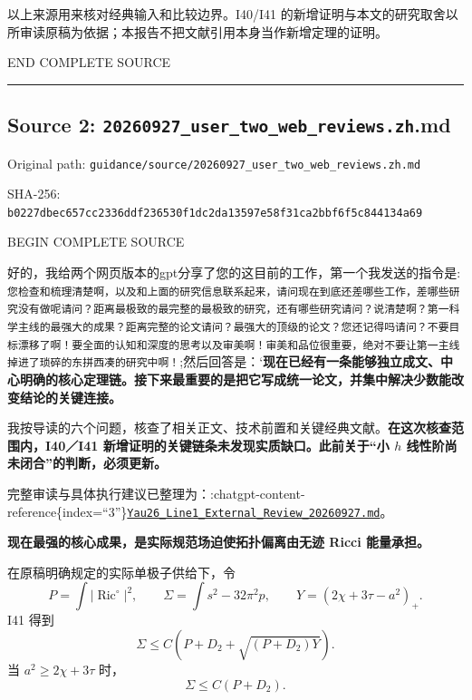 \documentclass[
  10pt,
]{article}
\begin{document}
以上来源用来核对经典输入和比较边界。I40/I41
的新增证明与本文的研究取舍以所审读原稿为依据；本报告不把文献引用本身当作新增定理的证明。

END COMPLETE SOURCE

\begin{center}\rule{0.5\linewidth}{0.5pt}\end{center}

\hypertarget{source-2-20260927_user_two_web_reviews.zh.md}{%
\subsection{Source 2:
\nolinkurl{20260927_user_two_web_reviews.zh}.md}\label{source-2-20260927_user_two_web_reviews.zh.md}}

Original path:
\nolinkurl{guidance/source/20260927_user_two_web_reviews.zh.md}

SHA-256:
\nolinkurl{b0227dbec657cc2336ddf236530f1dc2da13597e58f31ca2bbf6f5c844134a69}

BEGIN COMPLETE SOURCE

好的，我给两个网页版本的gpt分享了您的这目前的工作，第一个我发送的指令是:\texttt{您检查和梳理清楚啊，以及和上面的研究信息联系起来，请问现在到底还差哪些工作，差哪些研究没有做呢请问？距离最极致的最完整的最极致的研究，还有哪些研究请问？说清楚啊？第一科学主线的最强大的成果？距离完整的论文请问？最强大的顶级的论文？您还记得吗请问？不要目标漂移了啊！要全面的认知和深度的思考以及审美啊！审美和品位很重要，绝对不要让第一主线掉进了琐碎的东拼西凑的研究中啊！};然后回答是：`\textbf{现在已经有一条能够独立成文、中心明确的核心定理链。接下来最重要的是把它写成统一论文，并集中解决少数能改变结论的关键连接。}

我按导读的六个问题，核查了相关正文、技术前置和关键经典文献。\textbf{在这次核查范围内，I40／I41
新增证明的关键链条未发现实质缺口。此前关于``小 \(h\)
线性阶尚未闭合''的判断，必须更新。}

完整审读与具体执行建议已整理为：:chatgpt-content-reference\{index=``3''\}\href{sandbox:/workspace/scratch/e82e2d951212/Yau26_Line1_External_Review_20260927.md}{\nolinkurl{Yau26_Line1_External_Review_20260927.md}}。

\textbf{现在最强的核心成果，是实际规范场迫使拓扑偏离由无迹 Ricci
能量承担。}

在原稿明确规定的实际单极子供给下，令 \[
P=\int|\operatorname{Ric}^{\circ}|^2,\qquad
\Sigma=\int s^2-32\pi^2p,\qquad
Y=(2\chi+3\tau-a^2)_+.
\] I41 得到 \[
\boxed{\Sigma\le C\left(P+D_2+\sqrt{(P+D_2)Y}\right).}
\] 当 \(a^2\ge2\chi+3\tau\) 时， \[
\boxed{\Sigma\le C(P+D_2).}
\]
\end{document}
